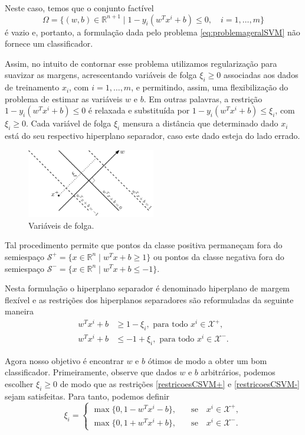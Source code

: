 \documentclass[12pt,a4paper]{scrartcl}
\def\Xset{\mathcal{X}}
\def\RR{\mathds{R}}
\theoremstyle{definition}%
\begin{document}
Neste caso, temos que o conjunto factível
\[
\Omega = \{ (w,b) \in \RR^{n+1} \mid 1-y_{i}(w^{T}x^{i} + b) \leq 0 , \quad i=1, \ldots , m \}
\]
é vazio e, portanto, a formulação dada pelo problema \eqref{eq:problemageralSVM} não fornece um classificador.

Assim, no intuito de contornar esse problema utilizamos regularização para suavizar as margens, acrescentando variáveis de folga $\xi_{i} \geq 0$ associadas aos dados de treinamento $x_{i}$, com $i=1, \ldots , m$, e permitindo, assim, uma flexibilização do problema de estimar as variáveis $w$ e $b$. Em outras palavras, a restrição $1-y_{i}(w^{T}x^{i} + b) \leq 0$ é relaxada e substituída por $1-y_{i}(w^{T}x^{i} + b) \leq \xi_{i} $, com $\xi_{i} \geq 0$. Cada variável de folga $\xi_{i}$ mensura a distância que determinado dado $x_{i}$ está do seu respectivo hiperplano separador, caso este dado esteja do lado errado.

\begin{figure}[!ht] 
	\centering
	\includegraphics[width=0.50\textwidth]{variaveis_de_folga}
	\caption{Variáveis de folga. \label{fig:variaveis_de_folga}}
\end{figure}

Tal procedimento permite que pontos da classe positiva permaneçam fora do semiespaço $\mathcal{S}^{+}=\{x\in \RR^n \mid w^{T}x+b\geq 1\}$ ou pontos da classe negativa fora do semiespaço $\mathcal{S}^{-}=\{x\in \RR^n \mid w^{T}x+b\leq -1\}$. 

Nesta formulação o hiperplano separador é denominado hiperplano de margem flexível e as restrições dos hiperplanos separadores são reformuladas da seguinte maneira 
\begin{align}
w^{T}x^{i}+b &\geq 1 - \xi_{i} , \text{ para  todo } x^{i} \in \Xset^{+}, \label{restricoesCSVM+} \\
w^{T}x^{i}+b &\leq -1 +\xi_{i} , \text{ para  todo } x^{i} \in \Xset^{-}. \label{restricoesCSVM-}
\end{align}


Agora nosso objetivo é encontrar $w$ e $b$ ótimos de modo a obter um bom classificador. Primeiramente, observe que dados $w$ e $b$ arbitrários, podemos escolher $\xi_{i} \geq 0$ de modo que as restrições \eqref{restricoesCSVM+} e \eqref{restricoesCSVM-} sejam satisfeitas. Para tanto, podemos definir
\[
\xi_{i} =  \left \{ \begin{array}{cc} \max\{0, 1-w^{T}x^{i}-b\}, & \quad \text{se} \quad x^{i} \in \Xset^{+}, \\
\max\{0, 1+w^{T}x^{i}+b\}, & \quad \text{se} \quad x^{i} \in \Xset^{-}.
\end{array} \right .
\]
 
\end{document}
